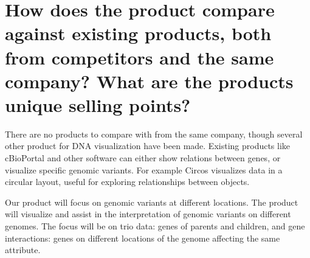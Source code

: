 \section{How does the product compare against existing products, both from competitors and the same company? What are the products unique selling points?}
There are no products to compare with from the same company, though several other product for DNA visualization have been made.
Existing products like cBioPortal \cite{cbio} and other software can either show relations between genes, or visualize specific genomic variants. %
For example Circos \cite{circos} visualizes data in a circular layout, useful for exploring relationships between objects.


Our product will focus on genomic variants at different locations.
The product will visualize and assist in the interpretation of genomic variants on different genomes.
The focus will be on trio data: genes of parents and children, and gene interactions: genes on different locations of the genome affecting the same attribute.
